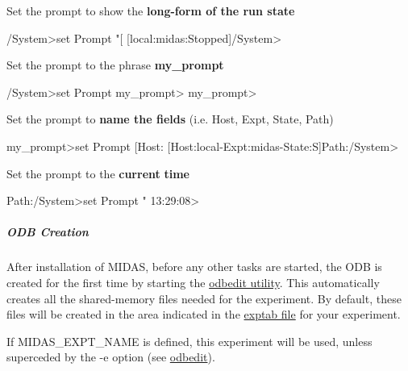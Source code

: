 \begin{DoxyEnumerate}
\item Set the prompt to show the {\bfseries  long-\/form of the run state } 
\begin{DoxyCode}
  /System>set Prompt "[%
  [local:midas:Stopped]/System>
\end{DoxyCode}
 
\item Set the prompt to the phrase {\bfseries my\_\-prompt} 
\begin{DoxyCode}
    /System>set Prompt my_prompt>
    my_prompt>
\end{DoxyCode}



\item Set the prompt to {\bfseries  name the fields } (i.e. Host, Expt, State, Path) 
\begin{DoxyCode}
    my_prompt>set Prompt [Host:%
    [Host:local-Expt:midas-State:S]Path:/System>
\end{DoxyCode}



\item Set the prompt to the {\bfseries current} {\bfseries time} 
\begin{DoxyCode}
    Path:/System>set Prompt "%
    13:29:08>
\end{DoxyCode}






\label{RC_odbedit_examples_idx_ODB_create}
\hypertarget{RC_odbedit_examples_idx_ODB_create}{}
 
\end{DoxyEnumerate}\hypertarget{RC_odbedit_examples_RC_odbedit_create_ODB}{}\subparagraph{ODB Creation}\label{RC_odbedit_examples_RC_odbedit_create_ODB}
After installation of MIDAS, before any other tasks are started, the ODB is created for the first time by starting the \hyperlink{RC_odbedit_utility}{odbedit utility}. This automatically creates all the shared-\/memory files needed for the experiment. By default, these files will be created in the area indicated in the \hyperlink{Q_Linux_Q_Linux_Exptab}{exptab file} for your experiment. \par
 If MIDAS\_\-EXPT\_\-NAME is defined, this experiment will be used, unless superceded by the -\/e option (see \hyperlink{RC_odbedit_utility}{odbedit}). \par
 
